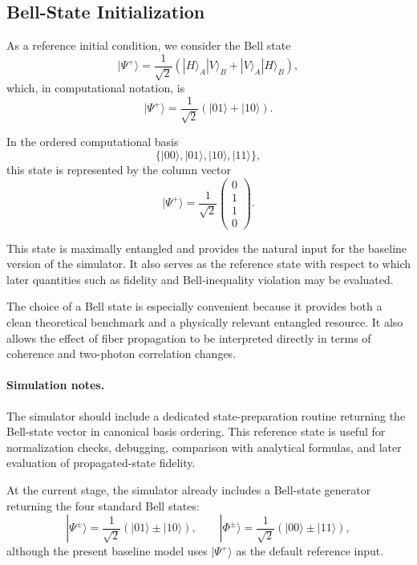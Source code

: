 \documentclass[a4paper]{article}
\begin{document}
\subsection{Bell-State Initialization}

As a reference initial condition, we consider the Bell state
\[
|\Psi^{+}\rangle
=
\frac{1}{\sqrt{2}}
\left(
|H\rangle_A |V\rangle_B
+
|V\rangle_A |H\rangle_B
\right),
\]
which, in computational notation, is
\[
|\Psi^{+}\rangle
=
\frac{1}{\sqrt{2}}
\left(
|01\rangle + |10\rangle
\right).
\]

In the ordered computational basis
\[
\{|00\rangle, |01\rangle, |10\rangle, |11\rangle\},
\]
this state is represented by the column vector
\[
|\Psi^{+}\rangle
=
\frac{1}{\sqrt{2}}
\begin{pmatrix}
0\\
1\\
1\\
0
\end{pmatrix}.
\]

This state is maximally entangled and provides the natural input for the baseline version of the simulator. It also serves as the reference state with respect to which later quantities such as fidelity and Bell-inequality violation may be evaluated.

The choice of a Bell state is especially convenient because it provides both a clean theoretical benchmark and a physically relevant entangled resource. It also allows the effect of fiber propagation to be interpreted directly in terms of coherence and two-photon correlation changes.

\paragraph{Simulation notes.}
The simulator should include a dedicated state-preparation routine returning the Bell-state vector in canonical basis ordering. This reference state is useful for normalization checks, debugging, comparison with analytical formulas, and later evaluation of propagated-state fidelity.

At the current stage, the simulator already includes a Bell-state generator returning the four standard Bell states:
\[
|\Psi^{\pm}\rangle
=
\frac{1}{\sqrt{2}}\left(|01\rangle \pm |10\rangle\right),
\qquad
|\Phi^{\pm}\rangle
=
\frac{1}{\sqrt{2}}\left(|00\rangle \pm |11\rangle\right),
\]
although the present baseline model uses \( |\Psi^+\rangle \) as the default reference input.

\end{document}
